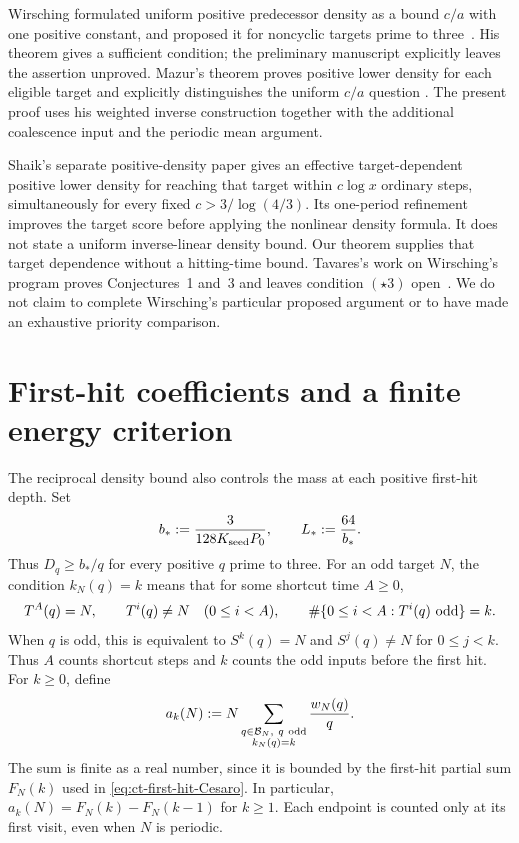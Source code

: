 \documentclass[11pt,a4paper]{article}
\begin{document}
Wirsching formulated uniform positive predecessor density as a bound
\(c/a\) with one positive constant, and proposed it for noncyclic
targets prime to three~\cite[Definition~1 and Theorem~1]{Wirsching2003}.
His theorem gives a sufficient condition; the preliminary manuscript
explicitly leaves the assertion unproved. Mazur's theorem proves
positive lower density for each eligible target and explicitly
distinguishes the uniform \(c/a\) question
\cite[Section~1.2]{MazurPredecessors2026}. The present proof uses his
weighted inverse construction together with the additional coalescence
input and the periodic mean argument.

Shaik's separate positive-density paper
\cite[Theorems~I.2 and~10.10]{ShaikPositive2026} gives an effective
target-dependent positive lower density for reaching that target within
\(c\log x\) ordinary steps, simultaneously for every fixed
\(c>3/\log(4/3)\). Its one-period refinement improves the target
score before applying the nonlinear density formula. It does not state
a uniform inverse-linear density bound. Our theorem supplies that target
dependence without a hitting-time bound. Tavares's work on Wirsching's
program proves Conjectures~1 and~3 and leaves condition
\((\star3)\) open~\cite{Tavares2026}. We do not claim to complete
Wirsching's particular proposed argument or to have made an exhaustive
priority comparison.

\section{First-hit coefficients and a finite energy criterion}
\label{sec:ct-finite-energy}

The reciprocal density bound also controls the mass at each positive
first-hit depth. Set
\[
 b_*:=\frac{3}{128K_{\rm seed}P_0},\qquad L_*:=\frac{64}{b_*}.
\]
Thus \(D_q\ge b_*/q\) for every positive \(q\) prime to three.
For an odd target \(N\), the condition \(k_N(q)=k\) means that
for some shortcut time \(A\ge0\),
\[
 T^A(q)=N,\qquad T^i(q)\ne N\quad(0\le i<A),\qquad
 \#\{0\le i<A:T^i(q)\ {\rm odd}\}=k.
\]
When \(q\) is odd, this is equivalent to \(S^k(q)=N\) and
\(S^j(q)\ne N\) for \(0\le j<k\). Thus \(A\) counts shortcut
steps and \(k\) counts the odd inputs before the first hit.
For \(k\ge0\), define
\begin{equation}\label{eq:ct-exact-first-hit-coefficient}
 a_k(N):=N\sum_{\substack{q\in\mathcal B_N,\ q\ {\rm odd}\\
                         k_N(q)=k}}\frac{w_N(q)}q.
\end{equation}
The sum is finite as a real number, since it is bounded by the
first-hit partial sum \(F_N(k)\) used in
\eqref{eq:ct-first-hit-Cesaro}. In particular,
\(a_k(N)=F_N(k)-F_N(k-1)\) for \(k\ge1\).
Each endpoint is counted only at its first visit, even when \(N\)
is periodic.
\end{document}
